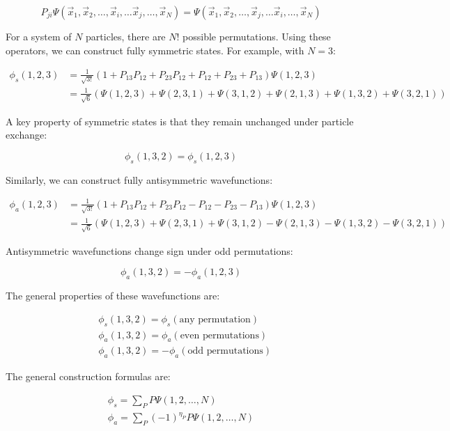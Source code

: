 \documentclass[italian]{HKNdocument}
\begin{document}
\begin{equation}
P_{ji}\Psi(\vec{x}_1,\vec{x}_2,\ldots,\vec{x}_i,\ldots\vec{x}_j,\ldots,\vec{x}_N)=\Psi(\vec{x}_1,\vec{x}_2,\ldots,\vec{x}_j,\ldots\vec{x}_i,\ldots,\vec{x}_N)
\end{equation}

For a system of $N$ particles, there are $N!$ possible permutations. Using these operators, we can construct fully symmetric states. For example, with $N=3$:

\begin{align}
\phi_s(1,2,3)&=\frac{1}{\sqrt{3!}}(1+P_{13}P_{12}+P_{23}P_{12}+P_{12}+P_{23}+P_{13})\Psi(1,2,3)\\
&=\frac{1}{\sqrt{6}}(\Psi(1,2,3)+\Psi(2,3,1)+\Psi(3,1,2)+\Psi(2,1,3)+\Psi(1,3,2)+\Psi(3,2,1))
\end{align}

A key property of symmetric states is that they remain unchanged under particle exchange:

\begin{equation}
\phi_s(1,3,2)=\phi_s(1,2,3)
\end{equation}

Similarly, we can construct fully antisymmetric wavefunctions:

\begin{align}
\phi_a(1,2,3)&=\frac{1}{\sqrt{3!}}(1+P_{13}P_{12}+P_{23}P_{12}-P_{12}-P_{23}-P_{13})\Psi(1,2,3)\\
&=\frac{1}{\sqrt{6}}(\Psi(1,2,3)+\Psi(2,3,1)+\Psi(3,1,2)-\Psi(2,1,3)-\Psi(1,3,2)-\Psi(3,2,1))
\end{align}

Antisymmetric wavefunctions change sign under odd permutations:

\begin{equation}
\phi_a(1,3,2)=-\phi_a(1,2,3)
\end{equation}

The general properties of these wavefunctions are:

\begin{align}
&\phi_s(1,3,2)=\phi_s(\text{any permutation})\\
&\phi_a(1,3,2)=\phi_a(\text{even permutations}) \\
&\phi_a(1,3,2)=-\phi_a(\text{odd permutations})
\end{align}

The general construction formulas are:

\begin{gather}
\phi_s=\sum_P P\Psi(1,2,\ldots,N) \\
\phi_a=\sum_P(-1)^{\eta_P}P\Psi(1,2,\ldots,N)
\end{gather}
\end{document}
